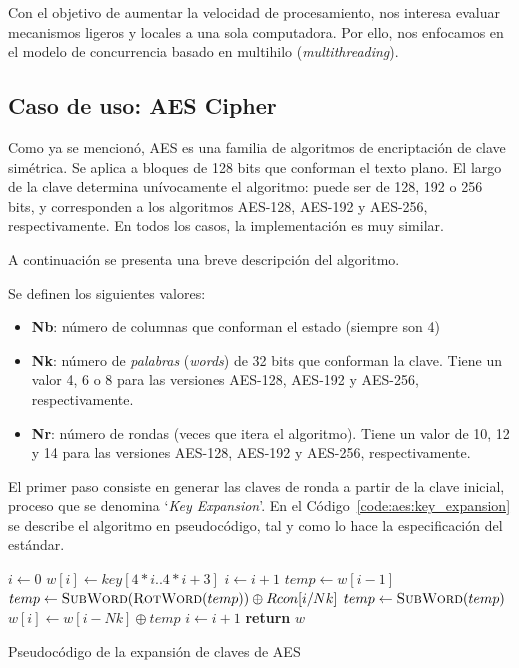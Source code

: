 \documentclass[11pt]{article}
\let\Oldsubsection\subsection
\renewcommand{\subsection}{\FloatBarrier\Oldsubsection}
\renewcommand*\Call[2]{\textproc{#1}(#2)}
\newcommand{\english}[1]{\textit{#1}}
\newcommand{\technical}[1]{\textit{#1}}
\begin{document}
Con el objetivo de aumentar la velocidad de procesamiento, nos interesa evaluar mecanismos ligeros y locales a una sola computadora. Por ello, nos enfocamos en el modelo de concurrencia basado en multihilo (\english{multithreading}).

\subsection{Caso de uso: AES Cipher}

Como ya se mencionó, AES es una familia de algoritmos de encriptación de clave simétrica. Se aplica a bloques de 128 bits que conforman el texto plano. El largo de la clave determina unívocamente el algoritmo: puede ser de 128, 192 o 256 bits, y corresponden a los algoritmos AES-128, AES-192 y AES-256, respectivamente. En todos los casos, la implementación es muy similar.

A continuación se presenta una breve descripción del algoritmo.

Se definen los siguientes valores:

\begin{itemize}
    \item \textbf{Nb}: número de columnas que conforman el estado (siempre son 4)
    \item \textbf{Nk}: número de \technical{palabras} (\english{words}) de 32 bits que conforman la clave. Tiene un valor 4, 6 o 8 para las versiones AES-128, AES-192 y AES-256, respectivamente.
    \item \textbf{Nr}: número de rondas (veces que itera el algoritmo). Tiene un valor de 10, 12 y 14 para las versiones AES-128, AES-192 y AES-256, respectivamente.
\end{itemize}

El primer paso consiste en generar las claves de ronda a partir de la clave inicial, proceso que se denomina `\english{Key Expansion}'. En el Código~\ref{code:aes:key_expansion} se describe el algoritmo en pseudocódigo, tal y como lo hace la especificación del estándar.

\begin{listing}[h] %
\begin{algorithmic}
    \State $i \gets 0$
        \State $w[i] \gets key[4*i\text{..}4*i+3]$
        \State $i \gets i+1$
    \EndWhile
        \State $temp \gets w[i-1]$
        \State $temp \gets \Call{SubWord}{\Call{RotWord}{temp}} \oplus Rcon[i/Nk]$
            \State $temp \gets \Call{SubWord}{temp}$
        \EndIf
        \State $w[i] \gets w[i-Nk] \oplus temp$
        \State $i \gets i+1$
    \EndWhile
    \State \textbf{return} $w$
\EndProcedure
\end{algorithmic}
\caption{Pseudocódigo de la expansión de claves de AES}
\label{code:aes:key_expansion}
\end{listing}
\end{document}
